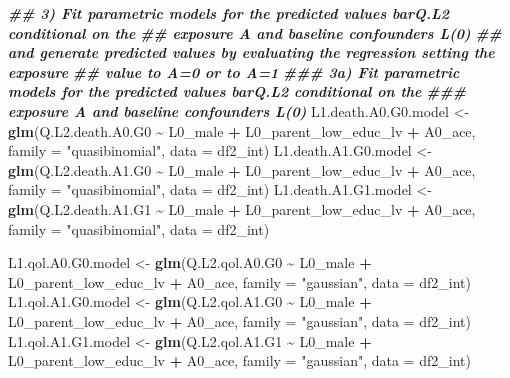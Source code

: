 \documentclass[
]{book}
\newenvironment{Shaded}{\begin{snugshade}}{\end{snugshade}}
\newcommand{\AttributeTok}[1]{\textcolor[rgb]{0.13,0.29,0.53}{#1}}
\newcommand{\DocumentationTok}[1]{\textcolor[rgb]{0.56,0.35,0.01}{\textbf{\textit{#1}}}}
\newcommand{\FunctionTok}[1]{\textcolor[rgb]{0.13,0.29,0.53}{\textbf{#1}}}
\newcommand{\NormalTok}[1]{#1}
\newcommand{\OtherTok}[1]{\textcolor[rgb]{0.56,0.35,0.01}{#1}}
\newcommand{\SpecialCharTok}[1]{\textcolor[rgb]{0.81,0.36,0.00}{\textbf{#1}}}
\newcommand{\StringTok}[1]{\textcolor[rgb]{0.31,0.60,0.02}{#1}}
\begin{document}
\begin{Shaded}
\begin{Highlighting}[]
\DocumentationTok{\#\# 3) Fit parametric models for the predicted values barQ.L2 conditional on the}
\DocumentationTok{\#\#    exposure A and baseline confounders L(0)}
\DocumentationTok{\#\#    and generate predicted values by evaluating the regression setting the exposure}
\DocumentationTok{\#\#    value to A=0 or to A=1}
\DocumentationTok{\#\#\# 3a) Fit parametric models for the predicted values barQ.L2 conditional on the}
\DocumentationTok{\#\#\#    exposure A and baseline confounders L(0)}
\NormalTok{L1.death.A0.G0.model }\OtherTok{\textless{}{-}} \FunctionTok{glm}\NormalTok{(Q.L2.death.A0.G0 }\SpecialCharTok{\textasciitilde{}}\NormalTok{ L0\_male }\SpecialCharTok{+}\NormalTok{ L0\_parent\_low\_educ\_lv }\SpecialCharTok{+}\NormalTok{ A0\_ace,}
                            \AttributeTok{family =} \StringTok{"quasibinomial"}\NormalTok{, }\AttributeTok{data =}\NormalTok{ df2\_int)}
\NormalTok{L1.death.A1.G0.model }\OtherTok{\textless{}{-}} \FunctionTok{glm}\NormalTok{(Q.L2.death.A1.G0 }\SpecialCharTok{\textasciitilde{}}\NormalTok{ L0\_male }\SpecialCharTok{+}\NormalTok{ L0\_parent\_low\_educ\_lv }\SpecialCharTok{+}\NormalTok{ A0\_ace,}
                            \AttributeTok{family =} \StringTok{"quasibinomial"}\NormalTok{, }\AttributeTok{data =}\NormalTok{ df2\_int)}
\NormalTok{L1.death.A1.G1.model }\OtherTok{\textless{}{-}} \FunctionTok{glm}\NormalTok{(Q.L2.death.A1.G1 }\SpecialCharTok{\textasciitilde{}}\NormalTok{ L0\_male }\SpecialCharTok{+}\NormalTok{ L0\_parent\_low\_educ\_lv }\SpecialCharTok{+}\NormalTok{ A0\_ace,}
                            \AttributeTok{family =} \StringTok{"quasibinomial"}\NormalTok{, }\AttributeTok{data =}\NormalTok{ df2\_int)}

\NormalTok{L1.qol.A0.G0.model }\OtherTok{\textless{}{-}} \FunctionTok{glm}\NormalTok{(Q.L2.qol.A0.G0 }\SpecialCharTok{\textasciitilde{}}\NormalTok{ L0\_male }\SpecialCharTok{+}\NormalTok{ L0\_parent\_low\_educ\_lv }\SpecialCharTok{+}\NormalTok{ A0\_ace,}
                          \AttributeTok{family =} \StringTok{"gaussian"}\NormalTok{, }\AttributeTok{data =}\NormalTok{ df2\_int)}
\NormalTok{L1.qol.A1.G0.model }\OtherTok{\textless{}{-}} \FunctionTok{glm}\NormalTok{(Q.L2.qol.A1.G0 }\SpecialCharTok{\textasciitilde{}}\NormalTok{ L0\_male }\SpecialCharTok{+}\NormalTok{ L0\_parent\_low\_educ\_lv }\SpecialCharTok{+}\NormalTok{ A0\_ace,}
                          \AttributeTok{family =} \StringTok{"gaussian"}\NormalTok{, }\AttributeTok{data =}\NormalTok{ df2\_int)}
\NormalTok{L1.qol.A1.G1.model }\OtherTok{\textless{}{-}} \FunctionTok{glm}\NormalTok{(Q.L2.qol.A1.G1 }\SpecialCharTok{\textasciitilde{}}\NormalTok{ L0\_male }\SpecialCharTok{+}\NormalTok{ L0\_parent\_low\_educ\_lv }\SpecialCharTok{+}\NormalTok{ A0\_ace,}
                          \AttributeTok{family =} \StringTok{"gaussian"}\NormalTok{, }\AttributeTok{data =}\NormalTok{ df2\_int)}


\end{Highlighting}
\end{Shaded}
\end{document}
